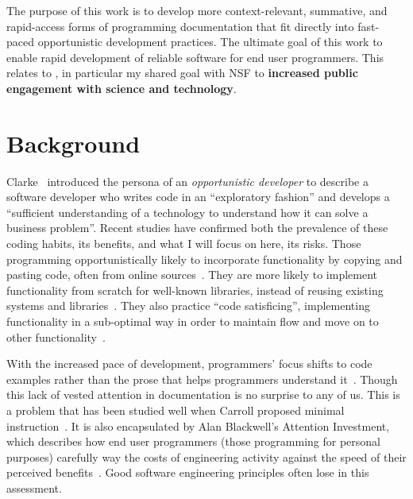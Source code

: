 \documentclass[12pt]{memoir}
\title{}
\author{Andrew Head}
\begin{document}


The purpose of this work is to develop more context-relevant, summative, and rapid-access forms of programming documentation that fit directly into fast-paced opportunistic development practices.
The ultimate goal of this work to enable rapid development of reliable software for end user programmers.
This relates to , in particular my shared goal with NSF to \textbf{increased public engagement with science and technology}.

\section{Background}

Clarke~\cite{clarke_what_2007} introduced the persona of an \emph{opportunistic developer} to describe a software developer who writes code in an ``exploratory fashion'' and develops a ``sufficient understanding of a technology to understand how it can solve a business problem''.
Recent studies have confirmed both the prevalence of these coding habits, its benefits, and what I will focus on here, its risks.
Those programming opportunistically likely to incorporate functionality by copying and pasting code, often from online sources~\cite{brandt_two_2009}.
They are more likely to implement functionality from scratch for well-known libraries, instead of reusing existing systems and libraries~\cite{brandt_opportunistic_2008}.
They also practice ``code satisficing'', implementing functionality in a sub-optimal way in order to maintain flow and move on to other functionality~\cite{brandt_opportunistic_2008}.

With the increased pace of development, programmers' focus shifts to code examples rather than the prose that helps programmers understand it~\cite{brandt_two_2009}.
Though this lack of vested attention in documentation is no surprise to any of us.
This is a problem that has been studied well when Carroll proposed minimal instruction~\cite{carroll_nurnberg_1990}.
It is also encapsulated by Alan Blackwell's Attention Investment, which describes how end user programmers (those programming for personal purposes) carefully way the costs of engineering activity against the speed of their perceived benefits~\cite{blackwell_pscyhological_2006}.
Good software engineering principles often lose in this assessment.
\end{document}
